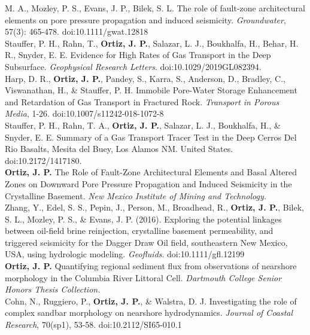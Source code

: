 \documentclass[11pt, letterpaper]{article}
\newcommand{\years}[1]{\marginnote{\scriptsize #1}}
\begin{document}
M. A., Mozley, P. S., Evans, J. P., Bilek, S. L. The role of fault-zone
architectural elements on pore pressure propagation and induced seismicity.
\emph{Groundwater}, 57(3): 465-478. doi:10.1111/gwat.12818\\
\years{2019}Stauffer, P. H., Rahn, T., \textbf{Ortiz, J. P.}, Salazar, L. J.,
Boukhalfa, H., Behar, H. R., Snyder, E. E. Evidence for High Rates of Gas
Transport in the Deep Subsurface. \emph{Geophysical Research Letters}.
doi:10.1029/2019GL082394.\\ 
\years{2018}Harp, D. R., \textbf{Ortiz, J. P.},
Pandey, S., Karra, S., Anderson, D., Bradley, C., Viswanathan, H., \& Stauffer,
P. H. Immobile Pore-Water Storage Enhancement and Retardation of Gas Transport
in Fractured Rock. \emph{Transport in Porous Media}, 1-26.
doi:10.1007/s11242-018-1072-8\\ 
\years{2018}Stauffer, P. H., Rahn, T. A.,
\textbf{Ortiz, J. P.}, Salazar, L. J., Boukhalfa, H., \& Snyder, E. E. Summary
of a Gas Transport Tracer Test in the Deep Cerros Del Rio Basalts, Mesita del
Buey, Los Alamos NM. United States. doi:10.2172/1417180.\\
\years{2017}\textbf{Ortiz, J. P.} The Role of Fault-Zone Architectural Elements
and Basal Altered Zones on Downward Pore Pressure Propagation and Induced
Seismicity in the Crystalline Basement. \emph{New Mexico Institute of Mining
and Technology.}\\ 
\years{2016}Zhang, Y., Edel, S. S., Pepin, J., Person, M.,
Broadhead, R., \textbf{Ortiz, J. P.}, Bilek, S. L., Mozley, P. S., \& Evans, J.
P. (2016). Exploring the potential linkages between oil-field brine
reinjection, crystalline basement permeability, and triggered seismicity for
the Dagger Draw Oil field, southeastern New Mexico, USA, using hydrologic
modeling. \emph{Geofluids}. doi:10.1111/gfl.12199\\
\years{2014}\textbf{Ortiz, J. P.} Quantifying regional sediment flux from
observations of nearshore morphology in the Columbia River Littoral Cell.
\emph{Dartmouth College Senior Honors Thesis Collection.}\\ 
\years{2014}Cohn, N., Ruggiero, P., \textbf{Ortiz, J. P.}, \& Walstra, D. J.
Investigating the role of complex sandbar morphology on nearshore
hydrodynamics. \emph{Journal of Coastal Research}, 70(sp1), 53-58.
doi:10.2112/SI65-010.1
\end{document}
